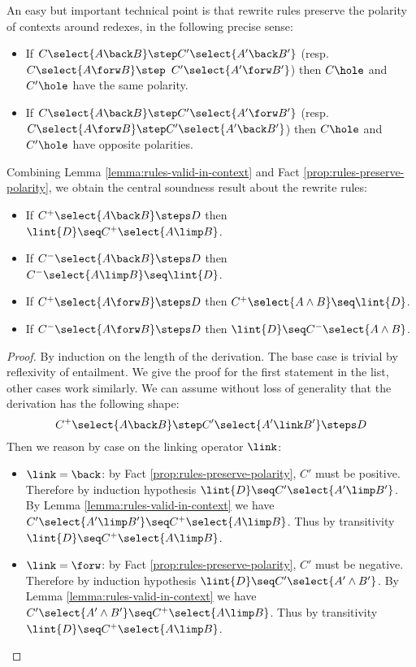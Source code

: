 An easy but important technical point is that rewrite rules preserve the
polarity of contexts around redexes, in the following precise sense:
\begin{fact}\label{prop:rules-preserve-polarity}
  \phantom{a}
  \begin{itemize}
    \item
      If $C\select{A\back B} \step C'\select{A'\back B'}$
      (resp. $C\select{A \forw B} \step $ $ C' \allowbreak\select{A' \forw B'}$) then
      $C\hole$ and $C'\hole$ have the same polarity.
    \item
      If $C\select{A\back B} \step C'\select{A'\forw B'}$ (resp.
      $C\select{A\forw B} \step C'\select{A'\back B'}$) then $C\hole$ and
      $C'\hole$ have opposite polarities.
  \end{itemize}
\end{fact}

Combining Lemma \ref{lemma:rules-valid-in-context} and Fact
\ref{prop:rules-preserve-polarity}, we obtain the central soundness result
about the rewrite rules:
\begin{lemma}\label{lemma:rewriting-valid-in-context}
  \phantom{a}
  \begin{itemize}
    \item If $C^+\select{A\back B}\steps D$ then $\lint{D} \seq C^+\select{A\limp B}$.
    \item If $C^-\select{A\back B} \steps D$ then $C^-\select{A\limp B}\seq \lint{D}$.
    \item If $C^+\select{A \forw B} \steps D$ then $ C^+\select{A \land B}\seq \lint{D}$.
    \item If $C^-\select{A \forw B} \steps D$ then $\lint{D} \seq C^-\select{A \land B}$.
  \end{itemize}
\end{lemma}
\begin{proof}
  By induction on the length of the derivation. The base case is trivial by
  reflexivity of entailment. We give the proof for the first statement in the
  list, other cases work similarly. We can assume without loss of generality
  that the derivation has the following shape:
  $$C^+\select{A \back B} \step C'\select{A' \link B'} \steps D$$
  Then we reason by case on the linking operator $\link$:
  \begin{itemize}
    \item $\link = \back$: by Fact \ref{prop:rules-preserve-polarity}, $C'$ must
    be positive. Therefore by induction hypothesis $\lint{D} \seq C'\select{A'
    \limp B'}$. By Lemma \ref{lemma:rules-valid-in-context} we have
    $C'\select{A' \limp B'} \seq C^+\select{A \limp B}$. Thus by transitivity
    $\lint{D} \seq C^+\select{A \limp B}$.
    \item $\link = \forw$: by Fact \ref{prop:rules-preserve-polarity}, $C'$ must
    be negative. Therefore by induction hypothesis $\lint{D} \seq C'\select{A'
    \land B'}$. By Lemma \ref{lemma:rules-valid-in-context} we have
    $C'\select{A' \land B'} \seq C^+\select{A \limp B}$. Thus by transitivity
    $\lint{D} \seq C^+\select{A \limp B}$.
  \end{itemize}
\end{proof}

